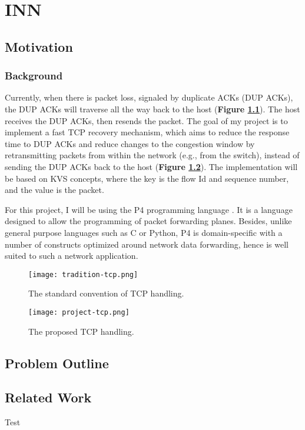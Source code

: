 \chapter{INN}

\section{Motivation}
\subsection{Background}

 Currently, when there is packet loss, signaled by duplicate ACKs (DUP ACKs), the DUP ACKs will traverse all the way back to the host (\textbf{Figure \ref{tradition-tcp}}). The host receives the DUP ACKs, then resends the packet. The goal of my project is to implement a fast TCP recovery mechanism, which aims to reduce the response time to DUP ACKs and reduce changes to the congestion window by retransmitting packets from within the network (e.g., from the switch), instead of sending the DUP ACKs back to the host (\textbf{Figure \ref{project-tcp}}). The implementation will be based on KVS concepts, where the key is the flow Id and sequence number, and the value is the packet.
 
For this project, I will be using the P4 programming language \cite{p4.org}. It is a language designed to allow the programming of packet forwarding planes. Besides, unlike general purpose languages such as C or Python, P4 is domain-specific with a number of constructs optimized around network data forwarding, hence is well suited to such a network application. 

\vspace*{5mm}

 \begin{figure}[h]
	\centering
	\texttt{[image: tradition-tcp.png]}
	\caption{The standard convention of TCP handling.}
	\label{tradition-tcp}
\end{figure}

\begin{figure}[h]
	\centering
	\texttt{[image: project-tcp.png]}
	\caption{The proposed TCP handling.}
	\label{project-tcp}
\end{figure}


\section{Problem Outline}
\section{Related Work}
\newpage
Test